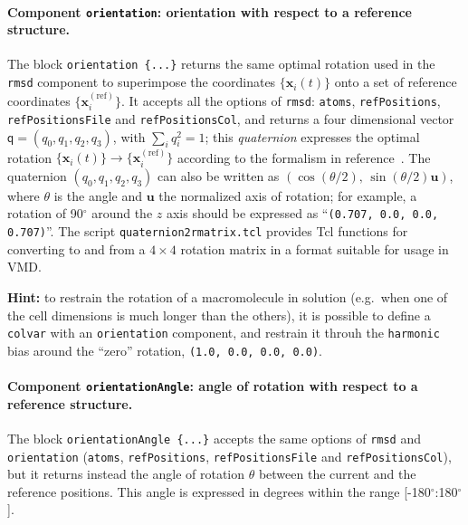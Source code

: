 \paragraph*{Component \texttt{orientation}: orientation with respect
  to a reference structure.}  The block \texttt{orientation~\{...\}}
returns the same optimal rotation used in the \texttt{rmsd} component
to superimpose the coordinates $\{\mathbf{x}_{i}(t)\}$ onto a set of
reference coordinates $\{\mathbf{x}_{i}^{\mathrm{(ref)}}\}$.  It accepts
all the options of \texttt{rmsd}: \texttt{atoms},
\texttt{refPositions}, \texttt{refPositionsFile} and
\texttt{refPositionsCol}, and returns a four dimensional vector
$\mathsf{q} = (q_0, q_1, q_2, q_3)$, with $\sum_{i} q_{i}^{2} = 1$; this
\emph{quaternion} expresses the optimal rotation $\{\mathbf{x}_{i}(t)\}
\rightarrow \{\mathbf{x}_{i}^{\mathrm{(ref)}}\}$ according to the
formalism in reference~\cite{Coutsias2004}.  The quaternion $(q_0,
q_1, q_2, q_3)$ can also be written as $\left(\cos(\theta/2), \,
  \sin(\theta/2)\mathbf{u}\right)$, where $\theta$ is the angle and
$\mathbf{u}$ the normalized axis of rotation; for example, a rotation
of 90$^{\circ}$ around the $z$ axis should be expressed as
``\texttt{(0.707, 0.0, 0.0, 0.707)}''.  The script
\texttt{quaternion2rmatrix.tcl} provides Tcl functions for converting
to and from a $4\times{}4$ rotation matrix in a format suitable for
usage in VMD.

\textbf{Hint:} to restrain the rotation of a macromolecule in solution
(e.g.~when one of the cell dimensions is much longer than the others),
it is possible to define a \texttt{colvar} with an
\texttt{orientation} component, and restrain it throuh the
\texttt{harmonic} bias around the ``zero'' rotation, \texttt{(1.0,
  0.0, 0.0, 0.0)}.


\paragraph*{Component \texttt{orientationAngle}: angle of rotation with
  respect to a reference structure.}  The block
\texttt{orientationAngle~\{...\}} accepts the same options of
\texttt{rmsd} and \texttt{orientation} (\texttt{atoms},
\texttt{refPositions}, \texttt{refPositionsFile} and
\texttt{refPositionsCol}), but it returns instead the angle of
rotation $\theta$ between the current and the reference positions.
This angle is expressed in degrees within the range
[-180$^{\circ}$:180$^{\circ}$].



